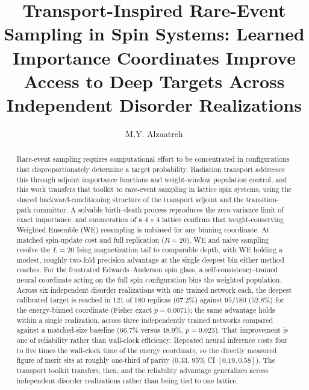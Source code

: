 \documentclass[a4paper,fleqn]{cas-sc}
\begin{document}
\let\WriteBookmarks\relax
\def\floatpagepagefraction{1}
\def\textpagefraction{.001}


\title[mode=title]{Transport-Inspired Rare-Event Sampling in Spin Systems: Learned
Importance Coordinates Improve Access to Deep Targets Across Independent Disorder
Realizations}

\author{M.Y. Alzaatreh}
\cormark[1]



\begin{abstract}
Rare-event sampling requires computational effort to be concentrated in configurations that
disproportionately determine a target probability. Radiation transport addresses this through
adjoint importance functions and weight-window population control, and this work transfers
that toolkit to rare-event sampling in lattice spin systems, using the shared
backward-conditioning structure of the transport adjoint and the transition-path committor. A
solvable birth--death process reproduces the zero-variance limit of exact importance, and
enumeration of a $4\times4$ lattice confirms that weight-conserving Weighted Ensemble (WE)
resampling is unbiased for any binning coordinate. At matched spin-update cost and full
replication ($R=20$), WE and naive sampling resolve the $L=20$ Ising magnetization tail to
comparable depth, with WE holding a modest, roughly two-fold precision advantage at the single
deepest bin either method reaches. For the
frustrated Edwards--Anderson spin glass, a self-consistency-trained neural coordinate acting on
the full spin configuration bins the weighted population. Across six independent disorder
realizations with one trained network each, the deepest calibrated target is reached in $121$
of $180$ replicas ($67.2\%$) against $95/180$ ($52.8\%$) for the energy-binned coordinate
(Fisher exact $p=0.0071$); the same advantage holds within a single realization, across three
independently trained networks compared against a matched-size baseline ($66.7\%$ versus
$48.9\%$, $p=0.023$). That improvement is one of reliability rather than wall-clock efficiency.
Repeated neural inference costs four to five times the wall-clock time of the energy
coordinate, so the directly measured figure of merit sits at roughly one-third of parity
($0.33$, $95\%$ CI $[0.19,0.58]$). The transport toolkit transfers, then, and the reliability
advantage generalizes across independent disorder realizations rather than being tied to one
lattice.
\end{abstract}
\end{document}
